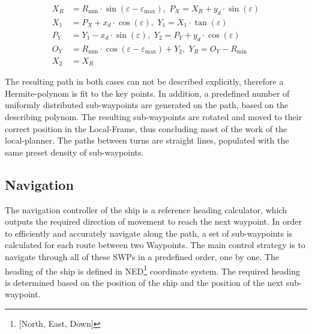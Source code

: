 \documentclass{ifacconf}
\begin{document}
\begin{align}
X_R &= R_\text{min} \cdot \sin(\varepsilon - \varepsilon _\text{max}),\,\, P_X = X_R + y_d \cdot \sin(\varepsilon)\\
X_1 &= P_X + x_d \cdot \cos(\varepsilon),\,\, Y_1 = X_1 \cdot \tan(\varepsilon)\\
P_Y &= Y_1 - x_d \cdot \sin(\varepsilon),\,\, Y_2 = P_Y + y_d \cdot \cos(\varepsilon)\\
O_Y &= R_\text{min} \cdot \cos(\varepsilon - \varepsilon _\text{max}) + Y_2,\,\, Y_R = O_Y - R_\text{min}\\
X_2 &= X_R
\end{align}

The resulting path in both cases can not be described explicitly, therefore a Hermite-polynom is fit to the key points. In addition, a predefined number of uniformly distributed sub-waypoints are generated on the path, based on the describing polynom. The resulting sub-waypoints are rotated and moved to their correct position in the Local-Frame, thus concluding most of the work of the local-planner. The paths between turns are straight lines, populated with the same preset density of sub-waypoints.

\subsection{Navigation}

The navigation controller of the ship is a reference heading calculator, which outputs the required direction of movement to reach the next waypoint. In order to efficiently and accurately navigate along the path, a set of sub-waypoints is calculated for each route between two Waypoints. The main control strategy is to navigate through all of these SWPs in a predefined order, one by one. The heading of the ship is defined in NED\footnote[1]{[North, East, Down]} coordinate system. The required heading is determined based on the position of the ship and the position of the next sub-waypoint.
\end{document}
